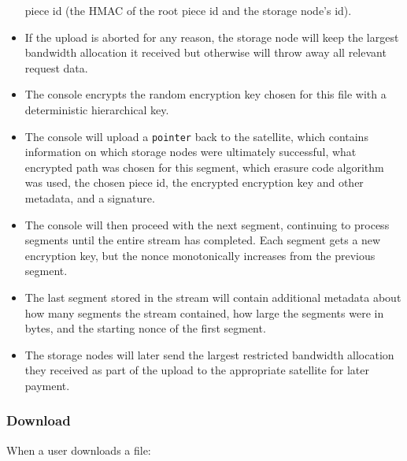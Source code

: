 \documentclass[a4paper,10pt]{article} \usepackage[utf8]{inputenc}
\newcommand{\x}[1]{{\tt #1}} \newcommand{\code}[1]{{\tt #1}}
\begin{document}
\begin{itemize}
  piece
  id (the HMAC of the root piece id and the storage node's id).
\item If the upload is aborted for any reason, the storage node will keep the
  largest bandwidth allocation it received but otherwise will throw away all
  relevant request data.
\item The console encrypts the random encryption key chosen for this file
  with a deterministic hierarchical key.
\item The console will upload a \x{pointer} back to the satellite, which
  contains information on which storage nodes were
  ultimately successful, what encrypted path was chosen for this segment, which
  erasure code algorithm was used, the chosen piece id, the
  encrypted encryption key and other metadata, and a signature.
\item The console will then proceed with the next segment, continuing to
  process segments until the entire stream has completed. Each segment gets
  a new encryption key, but the nonce monotonically increases from the previous
  segment.
\item The last segment stored in the stream will contain additional metadata
  about how many segments the stream contained, how large the segments were
  in bytes, and the starting nonce of the first segment.
\item The storage nodes will later send the largest restricted
  bandwidth allocation they received as part of the upload to the appropriate
  satellite for later payment.
\end{itemize}

\subsubsection{Download}

When a user downloads a file:
\end{document}
